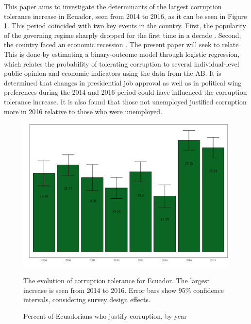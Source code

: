 \documentclass[12pt,a4]{article}\usepackage[]{graphicx}\usepackage[]{xcolor}
\makeatletter
\def\maxwidth{ %
  \ifdim\Gin@nat@width>\linewidth
    \linewidth
  \else
    \Gin@nat@width
  \fi
}
\newenvironment{knitrout}{}{} %
\makeatother
\begin{document}
This paper aims to investigate the determinants of the largest corruption tolerance increase in Ecuador, seen from 2014 to 2016, as it can be seen in Figure \ref{fig:ctoly}. This period coincided with two key events in the country. First, the popularity of the governing regime sharply dropped for the first time in a decade \parencite{Quillupangui.2016}. Second, the country faced an economic recession \parencite{Weisbrot.2017}. The present paper will seek to relate  This is done by estimating a binary-outcome model through logistic regression, which relates the probability of tolerating corruption to several individual-level public opinion and economic indicators using the data from the AB. It is determined that changes in presidential job approval as well as in political wing preferences during the 2014 and 2016 period could have influenced the corruption tolerance increase. It is also found that those not unemployed justified corruption more in 2016 relative to those who were unemployed.


\begin{figure}[htbp]
\begin{knitrout}
\color{fgcolor}

{\centering \includegraphics[width=\maxwidth]{figure/ctol_graph-1} 

}


\end{knitrout}
\caption{Percent of Ecuadorians who justify corruption, by year}
\label{fig:ctoly}
The evolution of corruption tolerance for Ecuador. The largest increase is seen from 2014 to 2016. Error bars show 95\% confidence intervals, considering survey design effects.
\end{figure}
\end{document}
